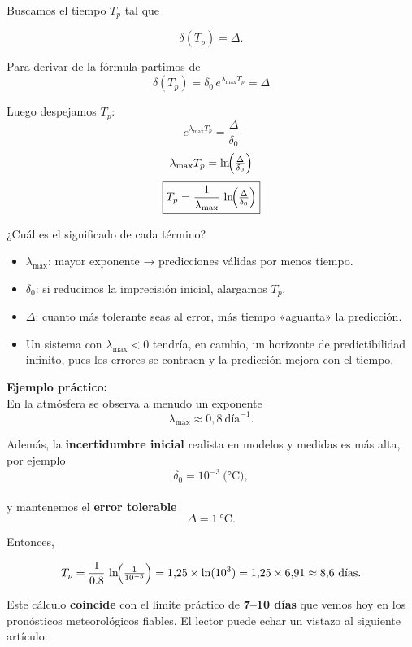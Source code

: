 \documentclass[
  11pt,
  a4paper,
  DIV=11,
  numbers=noendperiod]{scrreprt}
\providecommand{\tightlist}{%
  \setlength{\itemsep}{0pt}\setlength{\parskip}{0pt}}
\begin{document}
Buscamos el tiempo \(T_p\) tal que

\[
\delta(T_p) = \Delta.
\]

Para derivar de la fórmula partimos de\\
\[
   \delta(T_p) = \delta_0\,e^{\lambda_{\max}T_p} = \Delta
   \]

Luego despejamos \(T_p\):\\
\[
   e^{\lambda_{\max}T_p} = \frac{\Delta}{\delta_0}
   \] \[
   \lambda_{\max}T_p = \ln\!\Bigl(\tfrac{\Delta}{\delta_0}\Bigr)
   \] \[
   \boxed{T_p = \frac{1}{\lambda_{\max}}\,\ln\!\Bigl(\tfrac{\Delta}{\delta_0}\Bigr)}
   \]

¿Cuál es el significado de cada término?

\begin{itemize}
\tightlist
\item
  \textbf{\(\lambda_{\max}\)}: mayor exponente → predicciones válidas
  por menos tiempo.\\
\item
  \textbf{\(\delta_0\)}: si reducimos la imprecisión inicial, alargamos
  \(T_p\).\\
\item
  \textbf{\(\Delta\)}: cuanto más tolerante seas al error, más tiempo
  «aguanta» la predicción.
\item
  Un sistema con \(\lambda_{\max}<0\) tendría, en cambio, un horizonte
  de predictibilidad infinito, pues los errores se contraen y la
  predicción mejora con el tiempo.
\end{itemize}

\textbf{Ejemplo práctico:}\\
En la atmósfera se observa a menudo un exponente\\
\[
\lambda_{\max} \approx 0{,}8\ \text{día}^{-1}.
\]

Además, la \textbf{incertidumbre inicial} realista en modelos y medidas
es más alta, por ejemplo\\
\[
\delta_0 = 10^{-3}\ \text{(°C)},
\]\\
y mantenemos el \textbf{error tolerable}\\
\[
\Delta = 1\ \text{°C}.
\]

Entonces,

\[
T_p
= \frac{1}{0.8}\,\ln\!\Bigl(\tfrac{1}{10^{-3}}\Bigr)
=1{,}25 \times \ln(10^3)
=1{,}25 \times 6{,}91
\approx 8{,}6\ \text{días}.
\]

Este cálculo \textbf{coincide} con el límite práctico de \textbf{7--10
días} que vemos hoy en los pronósticos meteorológicos fiables. El lector
puede echar un vistazo al siguiente artículo:
\end{document}

